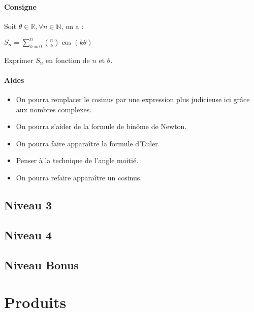 \documentclass[a4paper]{report}
\newcounter{exnumber}
\begin{document}
				\begin{tcolorbox}[colback=white,colframe=black,title=Exercice n°\arabic{exnumber} - Somme et trigonométrie]
					\paragraph{Consigne}
						Soit $\theta \in \mathbb{R}, \forall n \in \mathbb{N}$, on a :
						\begin{center}
							$S_n = \sum_{k=0}^{n} \binom{n}{k} \cos (k \theta)$
						\end{center}
						Exprimer $S_n$ en fonction de $n$ et $\theta$.
						
					\tcblower
					
					\paragraph{Aides}
						\begin{itemize}
							\item On pourra remplacer le cosinus par une expression plus judicieuse ici grâce aux nombres complexes.
							\item On pourra s'aider de la formule de binôme de Newton.
							\item On pourra faire apparaître la formule d'Euler.
							\item Penser à la technique de l'angle moitié.
							\item On pourra refaire apparaître un cosinus.
						\end{itemize}
				\end{tcolorbox}
				\addtocounter{exnumber}{1}
			
			\subsection{Niveau 3}
			
			\subsection{Niveau 4}
			
			\subsection{Niveau Bonus}
			
		\section{Produits}
		
\end{document}
